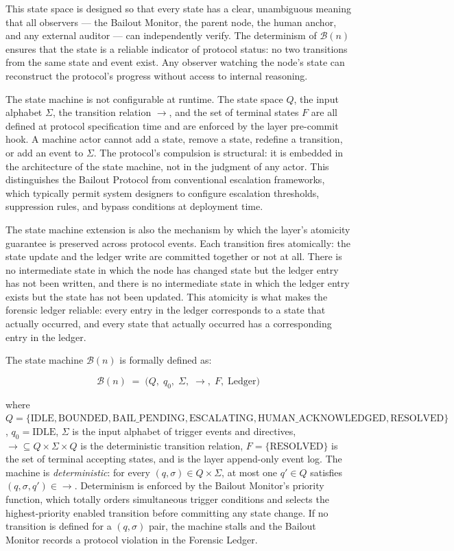 This state space is designed so that every state has a clear, unambiguous meaning that all observers --- the Bailout Monitor, the parent node, the human anchor, and any external auditor --- can independently verify. The determinism of $\mathcal{B}(n)$ ensures that the state is a reliable indicator of protocol status: no two transitions from the same state and event exist. Any observer watching the node's state can reconstruct the protocol's progress without access to internal reasoning.

The state machine is not configurable at runtime. The state space $Q$, the input alphabet $\Sigma$, the transition relation $\rightarrow$, and the set of terminal states $F$ are all defined at protocol specification time and are enforced by the \fact{} layer pre-commit hook. A machine actor cannot add a state, remove a state, redefine a transition, or add an event to $\Sigma$. The protocol's compulsion is structural: it is embedded in the architecture of the state machine, not in the judgment of any actor. This distinguishes the Bailout Protocol from conventional escalation frameworks, which typically permit system designers to configure escalation thresholds, suppression rules, and bypass conditions at deployment time.

The state machine extension is also the mechanism by which the \fact{} layer's atomicity guarantee is preserved across protocol events. Each transition fires atomically: the state update and the ledger write are committed together or not at all. There is no intermediate state in which the node has changed state but the ledger entry has not been written, and there is no intermediate state in which the ledger entry exists but the state has not been updated. This atomicity is what makes the forensic ledger reliable: every entry in the ledger corresponds to a state that actually occurred, and every state that actually occurred has a corresponding entry in the ledger.

The state machine $\mathcal{B}(n)$ is formally defined as:

\begin{equation}
\mathcal{B}(n) \;=\; \bigl( Q,\; q_0,\; \Sigma,\; \rightarrow,\; F,\; \text{Ledger} \bigr)
\label{eq:bailout-fsm}
\end{equation}

where $Q = \{\text{IDLE}, \text{BOUNDED}, \text{BAIL\_PENDING}, \text{ESCALATING}, \text{HUMAN\_ACKNOWLEDGED}, \text{RESOLVED}\}$, $q_0 = \text{IDLE}$, $\Sigma$ is the input alphabet of trigger events and directives, $\rightarrow \subseteq Q \times \Sigma \times Q$ is the deterministic transition relation, $F = \{\text{RESOLVED}\}$ is the set of terminal accepting states, and  is the \fact{} layer append-only event log. The machine is \emph{deterministic}: for every $(q, \sigma) \in Q \times \Sigma$, at most one $q' \in Q$ satisfies $(q, \sigma, q') \in \rightarrow$. Determinism is enforced by the Bailout Monitor's priority function, which totally orders simultaneous trigger conditions and selects the highest-priority enabled transition before committing any state change. If no transition is defined for a $(q, \sigma)$ pair, the machine stalls and the Bailout Monitor records a protocol violation in the Forensic Ledger.